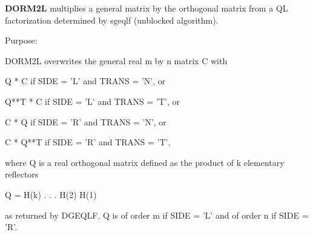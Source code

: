 {\bfseries D\+O\+R\+M2\+L} multiplies a general matrix by the orthogonal matrix from a Q\+L factorization determined by sgeqlf (unblocked algorithm). 

 \begin{DoxyParagraph}{Purpose\+: }
\begin{DoxyVerb} DORM2L overwrites the general real m by n matrix C with

       Q * C  if SIDE = 'L' and TRANS = 'N', or

       Q**T * C  if SIDE = 'L' and TRANS = 'T', or

       C * Q  if SIDE = 'R' and TRANS = 'N', or

       C * Q**T if SIDE = 'R' and TRANS = 'T',

 where Q is a real orthogonal matrix defined as the product of k
 elementary reflectors

       Q = H(k) . . . H(2) H(1)

 as returned by DGEQLF. Q is of order m if SIDE = 'L' and of order n
 if SIDE = 'R'.\end{DoxyVerb}
 
\end{DoxyParagraph}

